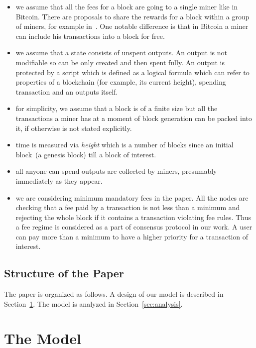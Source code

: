 \documentclass[]{llncs}   %
\newcommand{\authnote}[2]{\marginpar{\parbox{\marginparwidth}{\tiny %
  \textsf{#1 {\textcolor{blue}{notes: #2}}}}}%
  \textcolor{blue}{\textbf{\dag}}}
\newcommand{\authnote}[2]{
  \textsf{#1 \textcolor{blue}{: #2}}}
\newcommand{\authnote}[2]{}
\newcommand{\knote}[1]{{\authnote{\textcolor{green}{Alex notes}}{#1}}}
\begin{document}
\begin{itemize}
  \item{} we assume that all the fees for a block are going to a single miner like in Bitcoin. There are proposals to share the rewards for a block within a group of miners, for example in~\cite{eyal2016bitcoin,kogias2016enhancing}. One notable difference is that in Bitcoin a miner can include his transactions into a block for free.
  \item{} we assume that a state consists of unspent outputs. An output is not modifiable so can be only created and then spent fully. An output is protected by a script which is defined as a logical formula which can refer to properties of a blockchain (for example, its current height), spending transaction and an outputs itself. \knote{example} 
  \item{} for simplicity, we assume that a block is of a finite size but all the transactions a miner has at a moment of block generation can be packed into it, if otherwise is not stated explicitly.
  \item{} time is measured via \textit{height} which is a number of blocks since an initial block~(a genesis block) till a block of interest. 
  \item{} all anyone-can-spend outputs are collected by miners, presumably immediately as they appear.
  \item{} we are considering minimum mandatory fees in the paper. All the nodes are checking that a fee paid by a transaction is not less than a minimum and rejecting the whole block if it contains a transaction violating fee rules. Thus a fee regime is considered as a part of consensus protocol in our work. A user can pay more than a minimum to have a higher priority for a transaction of interest.   
\end{itemize}

\subsection{Structure of the Paper}

The paper is organized as follows. A design of our model is described in Section~\ref{sec:model}. The model is analyzed in Section~\ref{sec:analysis}.  
\knote{finish}


\section{The Model}
\label{sec:model}
\end{document}
